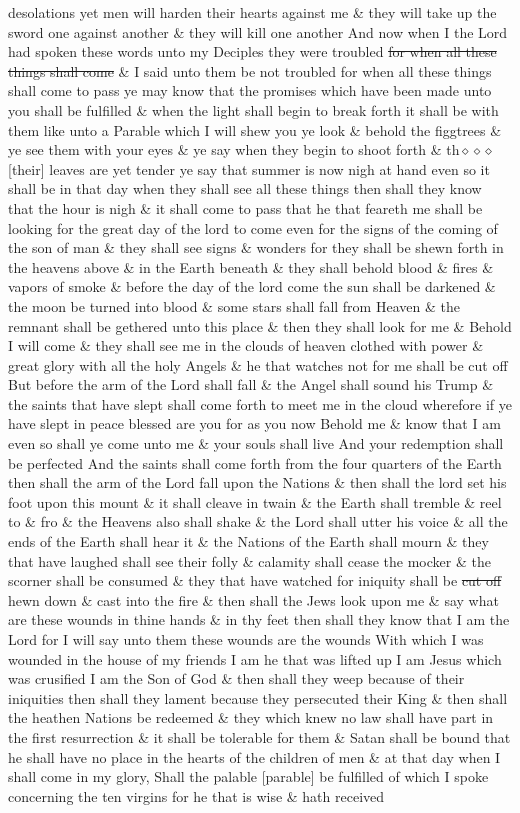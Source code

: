 desolations yet men will harden their hearts against me \& they will take up the sword one against another \& they will kill one another And now when I the Lord had spoken these words unto my Deciples they were troubled \sout{for when all these} \sout{things shall come} \& I said unto them be not troubled for when all these things shall come to pass ye may know that the promises which have been made unto you shall be fulfilled \& when the light shall begin to break forth it shall be with them like unto a Parable which I will shew you ye look \& behold the figgtrees \& ye see them with your eyes \& ye say when they begin to shoot forth \& th$\diamond\diamond\diamond$ [their] leaves are yet tender ye say that summer is now nigh at hand even so it shall be in that day when they shall see all these things then shall they know that the hour is nigh \& it shall come to pass that he that feareth me shall be looking for the great day of the lord to come even for the signs of the coming of the son of man \& they shall see signs \& wonders for they shall be shewn forth in the heavens above \& in the Earth beneath \& they shall behold blood \& fires \& vapors of smoke \& before the day of the lord come the sun shall be darkened \& the moon be turned into blood \& some stars shall fall from Heaven \& the remnant shall be gethered unto this place \& then they shall look for me \& Behold I will come \& they shall see me in the clouds of heaven clothed with power \& great glory with all the holy Angels \& he that watches not for me shall be cut off But before the arm of the Lord shall fall \& the Angel shall sound his Trump \& the saints that have slept shall come forth to meet me in the cloud wherefore if ye have slept in peace blessed are you for as you now Behold me \& know that I am even so shall ye come unto me \& your souls shall live And your redemption shall be perfected And the saints shall come forth from the four quarters of the Earth then shall the arm of the Lord fall upon the Nations \& then shall the lord set his foot upon this mount \& it shall cleave in twain \& the Earth shall tremble \& reel to \& fro \& the Heavens also shall shake \& the Lord shall utter his voice \& all the ends of the Earth shall hear it \& the Nations of the Earth shall mourn \& they that have laughed shall see their folly \& calamity shall cease the mocker \& the scorner shall be consumed \& they that have watched for iniquity shall be \sout{cut off} hewn down \& cast into the fire \& then shall the Jews look upon me \& say what are these wounds in thine hands \& in thy feet then shall they know that I am the Lord for I will say unto them these wounds are the wounds With which I was wounded in the house of my friends I am he that was lifted up I am Jesus which was crusified I am the Son of God \& then shall they weep because of their iniquities then shall they lament because they persecuted their King \& then shall the heathen Nations be redeemed \& they which knew no law shall have part in the first resurrection \& it shall be tolerable for them \& Satan shall be bound that he shall have no place in the hearts of the children of men \& at that day when I shall come in my glory, Shall the palable [parable] be fulfilled of which I spoke concerning the ten virgins for he that is wise \& hath received 